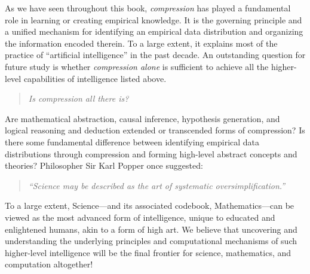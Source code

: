 \documentclass[../../book-main.tex]{subfiles}
\begin{document}
As we have seen throughout this book, \textit{compression} has played a fundamental role in learning or creating empirical knowledge. It is the governing principle and a unified mechanism for identifying an empirical data distribution and organizing the information encoded therein. To a large extent, it explains most of the practice of ``artificial intelligence'' in the past decade. An outstanding question for future study is whether \textit{compression alone} is sufficient to achieve all the higher-level capabilities of intelligence listed above. 
\begin{quote}
    \centering
    \textit{Is compression all there is?}
\end{quote}
Are mathematical abstraction, causal inference, hypothesis generation, and logical reasoning and deduction extended or transcended forms of compression? Is there some fundamental difference between identifying empirical data distributions through compression and forming high-level abstract concepts and theories? Philosopher Sir Karl Popper once suggested:
\begin{quote}
    \centering
    \textit{``Science may be described as the art of systematic oversimplification.''}
\end{quote}
To a large extent, Science---and its associated codebook, Mathematics---can be viewed as the most advanced form of intelligence, unique to educated and enlightened humans, akin to a form of high art. We believe that uncovering and understanding the underlying principles and computational mechanisms of such higher-level intelligence will be the final frontier for science, mathematics, and computation altogether! 
\end{document}
